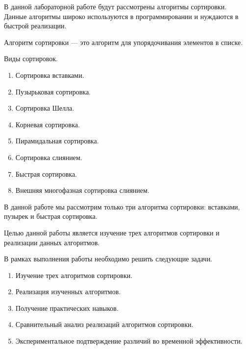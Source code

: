 \Introduction
В данной лабораторной работе будут рассмотрены алгоритмы сортировки. 
Данные алгоритмы широко используются в программировании и нуждаются в быстрой реализации.

Алгоритм сортировки — это алгоритм для упорядочивания элементов в списке.

Виды сортировок.
\begin{enumerate}
	\item Сортировка вставками.
	\item Пузырьковая сортировка.
	\item Сортировка Шелла.
	\item Корневая сортировка.
	\item Пирамидальная сортировка.
	\item Сортировка слиянием.
	\item Быстрая сортировка.
	\item Внешняя многофазная сортировка слиянием.
\end{enumerate}

В данной работе мы рассмотрим только три алгоритма сортировки: вставками, пузырек и быстрая сортировка.

Целью данной работы является изучение трех алгоритмов сортировки и реализации данных алгоритмов.

В рамках выполнения работы необходимо решить следующие задачи.

\begin{enumerate}
	\item Изучение трех алгоритмов сортировки.
	\item Реализация изученных алгоритмов.
	\item Получение практических навыков.
	\item Сравнительный анализ реализаций алгоритмов сортировки.
	\item Экспериментальное подтверждение различий во временной эффективности.
\end{enumerate}